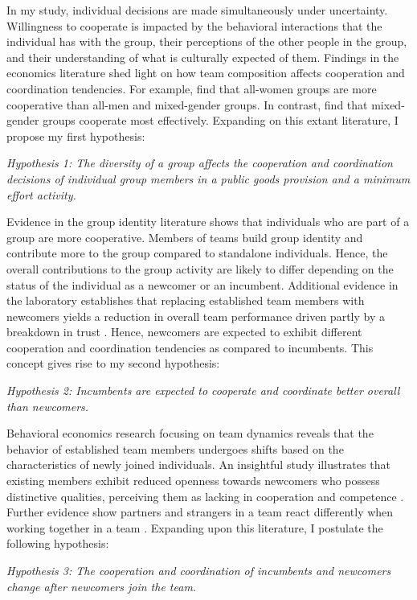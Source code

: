  \hspace  *{0mm} In my study, individual decisions are made simultaneously under uncertainty. Willingness to cooperate is impacted by the behavioral interactions that the individual has with the group, their perceptions of the other people in the group, and their understanding of what is culturally expected of them. Findings in the economics literature shed light on how team composition affects cooperation and coordination tendencies. For example, \cite{nt94} find that all-women groups are more cooperative than all-men and mixed-gender groups. In contrast, \cite{pbm19} find that mixed-gender groups cooperate most effectively. Expanding on this extant literature, I propose my first hypothesis:
 
 \textit{Hypothesis 1: The diversity of a group affects the cooperation and coordination decisions of individual group members in a public goods provision and a minimum effort activity.}

\hspace  *{0mm} Evidence in the group identity literature shows that individuals who are part of a group are more cooperative. Members of teams build group identity and contribute more to the group compared to standalone individuals. Hence, the overall contributions to the group activity are likely to differ depending on the status of the individual as a newcomer or an incumbent. Additional evidence in the laboratory establishes that replacing established team members with newcomers yields a reduction in overall team performance driven partly by a breakdown in trust \citep{m2013}. Hence, newcomers are expected to exhibit different cooperation and coordination tendencies as compared to incumbents. This concept gives rise to my second hypothesis: 

  \textit{Hypothesis 2: Incumbents are expected to cooperate and coordinate better overall than newcomers.}

\hspace  *{0mm} Behavioral economics research focusing on team dynamics reveals that the behavior of established team members undergoes shifts based on the characteristics of newly joined individuals. An insightful study illustrates that existing members exhibit reduced openness towards newcomers who possess distinctive qualities, perceiving them as lacking in cooperation and competence \citep{am18}. Further evidence show partners and strangers in a team react differently when working together in a team \citep{ght18}. Expanding upon this literature, I postulate the following hypothesis: 

    \textit{Hypothesis 3: The cooperation and coordination of incumbents and newcomers change after newcomers join the team.}

